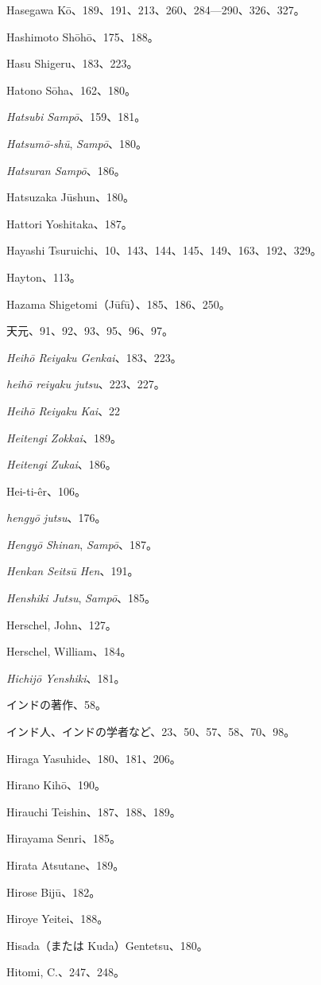 \documentclass[11pt]{article}
\begin{document}
Hasegawa Kō、189、191、213、260、284---290、326、327。\par
Hashimoto Shōhō、175、188。\par
Hasu Shigeru、183、223。\par
Hatono Sōha、162、180。\par
\emph{Hatsubi Sampō}、159、181。\par
\emph{Hatsumō-shū}, \emph{Sampō}、180。\par
\emph{Hatsuran Sampō}、186。\par
Hatsuzaka Jūshun、180。\par
Hattori Yoshitaka、187。\par
Hayashi Tsuruichi、10、143、144、145、149、163、192、329。\par
Hayton、113。\par
Hazama Shigetomi（Jūfū）、185、186、250。\par
天元、91、92、93、95、96、97。\par
\emph{Heihō Reiyaku Genkai}、183、223。\par
\emph{heihō reiyaku jutsu}、223、227。\par
\emph{Heihō Reiyaku Kai}、22\par
\emph{Heitengi Zokkai}、189。\par
\emph{Heitengi Zukai}、186。\par
Hei-ti-êr、106。\par
\emph{hengyō jutsu}、176。\par
\emph{Hengyō Shinan}, \emph{Sampō}、187。\par
\emph{Henkan Seitsū Hen}、191。\par
\emph{Henshiki Jutsu}, \emph{Sampō}、185。\par
Herschel, John、127。\par
Herschel, William、184。\par
\emph{Hichijō Yenshiki}、181。\par
インドの著作、58。\par
インド人、インドの学者など、23、50、57、58、70、98。\par
Hiraga Yasuhide、180、181、206。\par
Hirano Kihō、190。\par
Hirauchi Teishin、187、188、189。\par
Hirayama Senri、185。\par
Hirata Atsutane、189。\par
Hirose Bijū、182。\par
Hiroye Yeitei、188。\par
Hisada（または Kuda）Gentetsu、180。\par
Hitomi, C.、247、248。\par
\end{document}
